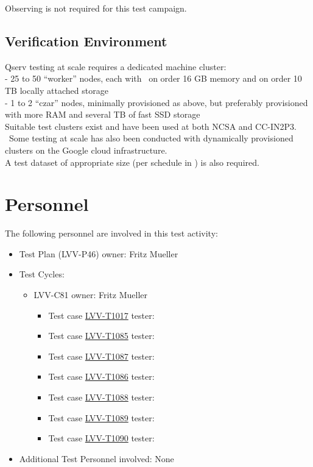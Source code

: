 \documentclass[DM,lsstdraft,STR,toc]{lsstdoc}
\begin{document}
  Observing is not required for this test campaign.

\subsection{Verification Environment}
\label{sect:hwconf}
  Qserv testing at scale requires a dedicated machine
cluster:\\[2\baselineskip]- 25 to 50 ``worker'' nodes, each with ~on
order 16 GB memory and on order 10 TB locally attached storage\\
- 1 to 2 ``czar'' nodes, minimally provisioned as above, but preferably
provisioned with more RAM and several TB of fast SSD
storage\\[2\baselineskip]Suitable test clusters exist and have been used
at both NCSA and CC-IN2P3. ~Some testing at scale has also been
conducted with dynamically provisioned clusters on the Google cloud
infrastructure.\\[2\baselineskip]A test dataset of appropriate size (per
schedule in ) is also required.





\section{Personnel}
\label{sect:personnel}

The following personnel are involved in this test activity:

\begin{itemize}
\item Test Plan (LVV-P46) owner: Fritz Mueller
\item Test Cycles:
\begin{itemize}
  \item LVV-C81 owner: 
    Fritz Mueller
  \begin{itemize}
    \item Test case \href{https://jira.lsstcorp.org/secure/Tests.jspa#/testCase/LVV-T1017}{LVV-T1017} tester: 
    \item Test case \href{https://jira.lsstcorp.org/secure/Tests.jspa#/testCase/LVV-T1085}{LVV-T1085} tester: 
    \item Test case \href{https://jira.lsstcorp.org/secure/Tests.jspa#/testCase/LVV-T1087}{LVV-T1087} tester: 
    \item Test case \href{https://jira.lsstcorp.org/secure/Tests.jspa#/testCase/LVV-T1086}{LVV-T1086} tester: 
    \item Test case \href{https://jira.lsstcorp.org/secure/Tests.jspa#/testCase/LVV-T1088}{LVV-T1088} tester: 
    \item Test case \href{https://jira.lsstcorp.org/secure/Tests.jspa#/testCase/LVV-T1089}{LVV-T1089} tester: 
    \item Test case \href{https://jira.lsstcorp.org/secure/Tests.jspa#/testCase/LVV-T1090}{LVV-T1090} tester: 
  \end{itemize}
\end{itemize}
\item Additional Test Personnel involved: None
\end{itemize}
\end{document}

